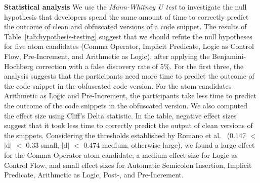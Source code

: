 {\bf Statistical analysis}
We use the \emph{Mann-Whitney U test} to
investigate the null hypothesis that developers 
spend the same amount of time to correctly
predict the outcome of clean and obfuscated versions of a code snippet.
The results of Table~\ref{tab:hypothesis-testing}
suggest that we should refute the null hypotheses for five atom candidates (Comma Operator, Implicit Predicate, Logic as Control Flow, Pre-Increment, and Arithmetic as Logic), after applying the Benjamini-Hochberg correction with a false discovery rate of 5\%. For the first three, the analysis suggests that the participants need more time to predict the outcome of the code snippet in the obfuscated code version. For the atom candidates Arithmetic as Logic and Pre-Increment, the participants take less time to predict the outcome of the code snippets in the obfuscated version. We also computed the effect size using Cliff's Delta statistic. In the table, negative effect sizes suggest that it took less time to correctly predict the output of clean versions of the snippets.  Considering the thresholds established by Romano et al.~\cite{Romano:2006:ASO} (0.147 $<$ $|$d$|$ $<$ 0.33 small, $|$d$|$ $<$ 0.474 medium, otherwise large), we found a large effect for the Comma Operator atom candidate; a medium effect size for Logic as Control Flow, and small effect sizes for Automatic Semicolon Insertion, Implicit Predicate, Arithmetic as Logic, Post-, and Pre-Increment. 








